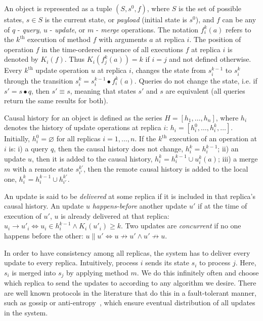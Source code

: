 An object is represented as a tuple $(S, s^{0}, f)$, where $S$ is the set of
possible states, $s \in S$ is the current state, or \textit{payload} (initial
state is $s^{0}$), and $f$ can be any of $q$ - \textit{query}, $u$ -
\textit{update}, or $m$ - \textit{merge} operations. The notation $f_{i}^{k}(a)$
refers to the $k^{\text{th}}$ execution of method $f$ with arguments $a$ at
replica $i$. The position of operation $f$ in the time-ordered sequence of all
executions $f$ at replica $i$ is denoted by $K_{i}(f)$. Thus
$K_{i}(f_{j}^{k}(a)) = k$ if $i = j$ and not defined otherwise. Every
$k^{\text{th}}$ update operation $u$ at replica $i$, changes the state from
$s_{i}^{k-1}$ to $s_{i}^{k}$ through the transition $s_{i}^{k} = s_{i}^{k-1}
\bullet f_{i}^{k}(a)$. Queries do not change the state, i.e. if $s' = s \bullet
q$, then $s' \equiv s$, meaning that states $s'$ and $s$ are equivalent (all
queries return the same results for both).

\begin{definition}
\label{def:casual_history_state-based}
\begin{itshape}
Causal history for an object is defined as the series $H =
[h_{1},\ldots,h_{n}]$, where $h_{i}$ denotes the history of update operations at
replica $i$: $h_{i} = [h_{i}^{0},\ldots,h_{i}^{k},\ldots]$. Initially,
$h_{i}^{0} = \varnothing$ for all replicas $i = 1,\ldots,n$. If the
$k^{\text{th}}$ execution of an operation at $i$ is: i) a query $q$, then the
causal history does not change, $h_{i}^{k} = h_{i}^{k-1}$; ii) an update $u$,
then it is added to the causal history, $h_{i}^{k} = h_{i}^{k-1} \cup
{u_{i}^{k}(a)}$; iii) a merge $m$ with a remote state $s_{i'}^{k'}$, then the
remote causal history is added to the local one, $h_{i}^{k} = h_{i}^{k-1} \cup
h_{i'}^{k'}$.
\end{itshape}
\end{definition}

An update is said to be \textit{delivered} at some replica if it is included in
that replica's causal history. An update $u$ \textit{happens-before} another
update $u'$ if at the time of execution of $u'$, $u$ is already delivered at
that replica: $u_{i} \rightarrow u'_{i} \iff u_{i} \in h_{i}^{k-1} \land
K_{i}(u'_{i}) \geq k$. Two updates are \textit{concurrent} if no one happens
before the other: $u \parallel u' \iff u \not\rightarrow u' \land u'
\not\rightarrow u$.

In order to have consistency among all replicas, the system has to
deliver every update to every replica. Intuitively, process $i$ sends its state
$s_{i}$ to process $j$. Here, $s_{i}$ is merged into $s_{j}$ by applying method
$m$. We do this infinitely often and choose which replica to send the updates to
according to any algorithm we desire. There are well known protocols in the
literature that do this in a fault-tolerant manner, such as gossip or
anti-entropy~\cite{Demers:1987:EAR:41840.41841,
Petersen:1997:FUP:268998.266711}, which ensure eventual distribution of all
updates in the system.

